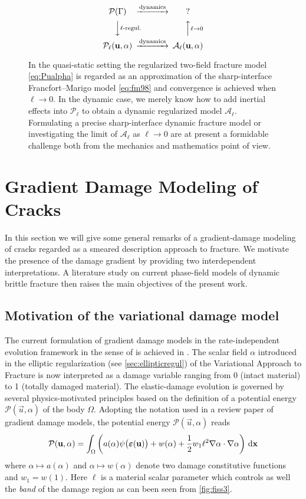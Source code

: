 \begin{figure}[htbp]
\centering
\[
\begin{CD}
\mathcal{P}(\Gamma) @>\text{dynamics}>> \text{?} \\
@VV\text{$\ell$-regul.}V @AA{\ell\to 0}A \\
\mathcal{P}_\ell(\vec{u},\alpha) @>\text{dynamics}>> \mathcal{A}_\ell(\vec{u},\alpha)
\end{CD}
\]
\caption{In the quasi-static setting the regularized two-field fracture model \eqref{eq:Pualpha} is regarded as an approximation of the sharp-interface Francfort--Marigo model \eqref{eq:fm98} and convergence is achieved when $\ell\to 0$. In the dynamic case, we merely know how to add inertial effects into $\mathcal{P}_\ell$ to obtain a dynamic regularized model $\mathcal{A}_\ell$. Formulating a precise sharp-interface dynamic fracture model or investigating the limit of $\mathcal{A}_\ell$ as $\ell\to 0$ are at present a formidable challenge both from the mechanics and mathematics point of view.} \label{fig:fourmodels}
\end{figure}

\section{Gradient Damage Modeling of Cracks} \label{sec:graddamage}
In this section we will give some general remarks of a gradient-damage modeling of cracks regarded as a smeared description approach to fracture. We motivate the presence of the damage gradient by providing two interdependent interpretations. A literature study on current phase-field models of dynamic brittle fracture then raises the main objectives of the present work.

\subsection{Motivation of the variational damage model}
The current formulation of gradient damage models in the rate-independent evolution framework in the sense of \cite{Mielke:2005} is achieved in \cite{PhamMarigo:2010,PhamMarigo:2010-1}. The scalar field $\alpha$ introduced in the elliptic regularization (see \cref{sec:ellipticregul}) of the Variational Approach to Fracture is now interpreted as a damage variable ranging from 0 (intact material) to 1 (totally damaged material). The elastic-damage evolution is governed by several physics-motivated principles based on the definition of a potential energy $\mathcal{P}(\vec{u},\alpha)$ of the body $\Omega$. Adopting the notation used in a review paper \cite{PhamAmorMarigoMaurini:2011} of gradient damage models, the potential energy $\mathcal{P}(\vec{u},\alpha)$ reads
\begin{equation} \label{eq:Pgd}
\mathcal{P}(\vec{u},\alpha)=\int_\Omega\left( a(\alpha)\psi\bigl(\eps(\vec{u})\bigr)+w(\alpha)+\frac{1}{2}w_1\ell^2\nabla\alpha\cdot\nabla\alpha\right)\dx
\end{equation}
where $\alpha\mapsto a(\alpha)$ and $\alpha\mapsto w(\alpha)$ denote two damage constitutive functions and $w_1=w(1)$. Here $\ell$ is a material scalar parameter which controls as well the \emph{band} of the damage region as can been seen from \cref{fig:fiss3}.

